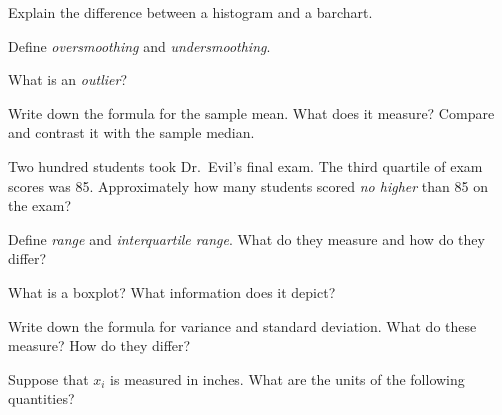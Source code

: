 \documentclass[addpoints,12pt]{exam}
\begin{document}
\begin{questions}
	
\question Explain the difference between a histogram and a barchart.

\question Define \emph{oversmoothing} and \emph{undersmoothing}.

\question What is an \emph{outlier}?

\question Write down the formula for the sample mean. What does it measure? Compare and contrast it with the sample median. 

\question Two hundred students took Dr.\ Evil's final exam. The third quartile of exam scores was 85. Approximately how many students scored \emph{no higher} than 85 on the exam? 

\question Define \emph{range} and \emph{interquartile range}. What do they measure and how do they differ? 

\question What is a boxplot? What information does it depict?

\question Write down the formula for variance and standard deviation. What do these measure? How do they differ?


\question Suppose that $x_i$ is measured in inches. 
What are the units of the following quantities? 
\end{questions}
\end{document}
